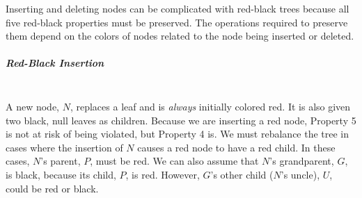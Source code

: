Inserting and deleting nodes can be complicated with red-black trees because all five red-black properties must be preserved. The operations required to preserve them depend on the colors of nodes related to the node being inserted or deleted.

\subparagraph{Red-Black Insertion} \hspace*{1mm} \vspace*{2mm} \\
A new node, $N$, replaces a leaf and is \textit{always} initially colored red. It is also given two black, null leaves as children. Because we are inserting a red node, Property 5 is not at risk of being violated, but Property 4 is. We must rebalance the tree in cases where the insertion of $N$ causes a red node to have a red child. In these cases, $N$'s parent, $P$, must be red. We can also assume that $N$'s grandparent, $G$, is black, because its child, $P$, is red. However, $G$'s other child ($N$'s uncle), $U$, could be red or black. \\

